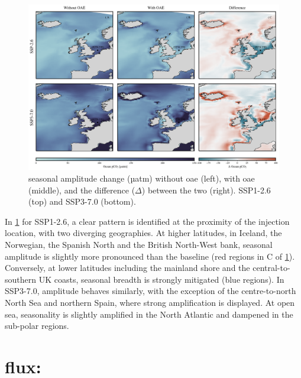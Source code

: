\begin{figure}[H]
\caption[ seasonal amplitude change]{ seasonal amplitude change (µatm) without \ac{oae} (left), with \ac{oae} (middle), and the difference ($\Delta$) between the two (right). SSP1-2.6 (top) and SSP3-7.0 (bottom).}
\label{pco2amplitude}
\centering
\includegraphics[width=15cm]{fig/3_Results/pCO2/fco2_ampl.png}

\end{figure}

In \cref{pco2amplitude} for SSP1-2.6, a clear pattern is identified at the proximity of the injection location, with two diverging geographies. At higher latitudes, in Iceland, the Norwegian, the Spanish North and the British North-West bank,  seasonal amplitude is slightly more pronounced than the baseline (red regions in C of \ref{pco2amplitude}). Conversely, at lower latitudes including the mainland shore and the central-to-southern UK coasts,  seasonal breadth is strongly mitigated (blue regions). In SSP3-7.0,  amplitude behaves similarly, with the exception of the centre-to-north North Sea and northern Spain, where strong amplification is displayed. At open sea,  seasonality is slightly amplified in the North Atlantic and dampened in the sub-polar regions.

\section{ flux:}

